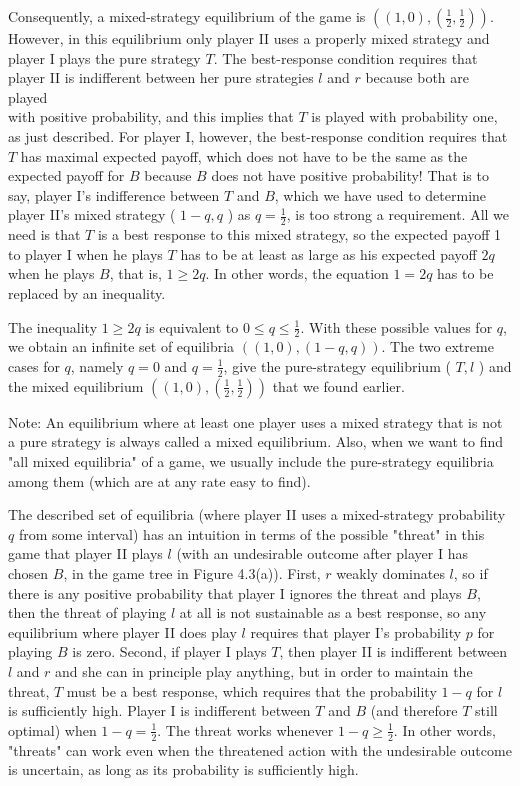 \documentclass[12pt]{article}
\begin{document}
Consequently, a mixed-strategy equilibrium of the game is $\left((1,0),\left(\frac{1}{2}, \frac{1}{2}\right)\right)$. However, in this equilibrium only player II uses a properly mixed strategy and player I plays the pure strategy $T$. The best-response condition requires that player II is indifferent between her pure strategies $l$ and $r$ because both are played\\
with positive probability, and this implies that $T$ is played with probability one, as just described. For player I, however, the best-response condition requires that $T$ has maximal expected payoff, which does not have to be the same as the expected payoff for $B$ because $B$ does not have positive probability! That is to say, player I's indifference between $T$ and $B$, which we have used to determine player II's mixed strategy ( $1-q, q$ ) as $q=\frac{1}{2}$, is too strong a requirement. All we need is that $T$ is a best response to this mixed strategy, so the expected payoff 1 to player I when he plays $T$ has to be at least as large as his expected payoff $2 q$ when he plays $B$, that is, $1 \geq 2 q$. In other words, the equation $1=2 q$ has to be replaced by an inequality.

The inequality $1 \geq 2 q$ is equivalent to $0 \leq q \leq \frac{1}{2}$. With these possible values for $q$, we obtain an infinite set of equilibria $((1,0),(1-q, q))$. The two extreme cases for $q$, namely $q=0$ and $q=\frac{1}{2}$, give the pure-strategy equilibrium ( $T, l$ ) and the mixed equilibrium $\left((1,0),\left(\frac{1}{2}, \frac{1}{2}\right)\right)$ that we found earlier.

Note: An equilibrium where at least one player uses a mixed strategy that is not a pure strategy is always called a mixed equilibrium. Also, when we want to find "all mixed equilibria" of a game, we usually include the pure-strategy equilibria among them (which are at any rate easy to find).

The described set of equilibria (where player II uses a mixed-strategy probability $q$ from some interval) has an intuition in terms of the possible "threat" in this game that player II plays $l$ (with an undesirable outcome after player I has chosen $B$, in the game tree in Figure 4.3(a)). First, $r$ weakly dominates $l$, so if there is any positive probability that player I ignores the threat and plays $B$, then the threat of playing $l$ at all is not sustainable as a best response, so any equilibrium where player II does play $l$ requires that player I's probability $p$ for playing $B$ is zero. Second, if player I plays $T$, then player II is indifferent between $l$ and $r$ and she can in principle play anything, but in order to maintain the threat, $T$ must be a best response, which requires that the probability $1-q$ for $l$ is sufficiently high. Player I is indifferent between $T$ and $B$ (and therefore $T$ still optimal) when $1-q=\frac{1}{2}$. The threat works whenever $1-q \geq \frac{1}{2}$. In other words, "threats" can work even when the threatened action with the undesirable outcome is uncertain, as long as its probability is sufficiently high.
\end{document}
